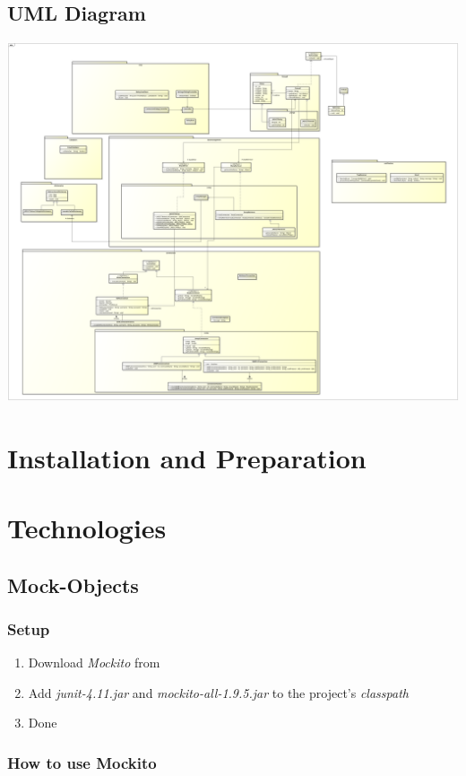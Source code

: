 \documentclass[11pt, a4paper]{article}
\begin{document}
\subsection{UML Diagram}
\includegraphics[width=\textwidth]{images/umlv3}

\section{Installation and Preparation}

\section{Technologies}
\subsection{Mock-Objects}
\subsubsection{Setup}

\begin{enumerate}
	\item Download \textit{Mockito} from \cite{MockitoDownload}
	\item Add \textit{junit-4.11.jar} and \textit{mockito-all-1.9.5.jar} to the project's \textit{classpath}
	\item Done
\end{enumerate}

\subsubsection{How to use Mockito}
\end{document}
